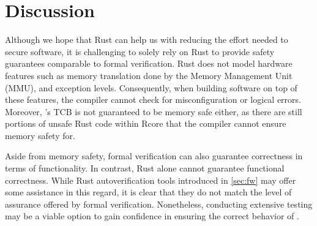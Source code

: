 
\chapter{Discussion}
\label{sec:discussion}

Although we hope that Rust can help us with reducing the effort needed to secure
software, it is challenging to solely rely on Rust to provide safety guarantees
comparable to formal verification. Rust does not model hardware features
such as memory translation done by the Memory Management Unit (MMU), and
exception levels. Consequently, when building software on top of these features,
the compiler cannot check for misconfiguration or logical errors.
Moreover, \rustsec{}'s TCB \rustcore{} is not guaranteed to be memory safe either,
as there are still portions of unsafe Rust code
within Rcore that the compiler cannot ensure memory safety for.

Aside from memory safety, formal verification can also guarantee correctness in
terms of functionality.
In contrast, Rust alone cannot guarantee functional correctness. While Rust
autoverification tools introduced in \autoref{sec:fw} may offer some assistance
in this regard, it is clear that they do not match the level of assurance
offered by formal verification.
Nonetheless, conducting extensive testing may be a viable option to gain
confidence in ensuring the correct behavior of \rustcore{}.
